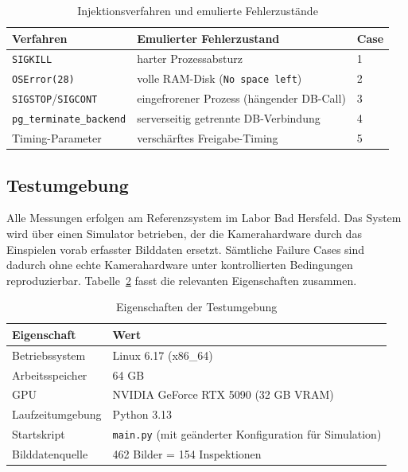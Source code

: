 \begin{table}[htbp]
    \centering
    \caption{Injektionsverfahren und emulierte Fehlerzustände}
    \label{tab:injektion}
    \begin{tabularx}{\textwidth}{l>{\raggedright\arraybackslash}Xl}
        \hline
        \textbf{Verfahren} & \textbf{Emulierter Fehlerzustand} & \textbf{Case} \\
        \hline
        \texttt{SIGKILL}               & harter Prozessabsturz                         & 1 \\
        \texttt{OSError(28)}           & volle RAM-Disk (\texttt{No space left})       & 2 \\
        \texttt{SIGSTOP}/\texttt{SIGCONT} & eingefrorener Prozess (hängender DB-Call)  & 3 \\
        \texttt{pg\_terminate\_backend}   & serverseitig getrennte DB-Verbindung       & 4 \\
        Timing-Parameter                  & verschärftes Freigabe-Timing               & 5 \\
        \hline
    \end{tabularx}
\end{table}

\subsection{Testumgebung}
\label{sec:methodik-umgebung}

Alle Messungen erfolgen am Referenzsystem im Labor Bad Hersfeld. Das System wird über
einen Simulator betrieben, der die Kamerahardware durch das Einspielen vorab erfasster
Bilddaten ersetzt. Sämtliche Failure Cases sind dadurch ohne echte Kamerahardware unter
kontrollierten Bedingungen reproduzierbar. Tabelle~\ref{tab:testumgebung} fasst die
relevanten Eigenschaften zusammen.

\begin{table}[htbp]
    \centering
    \caption{Eigenschaften der Testumgebung}
    \label{tab:testumgebung}
    \begin{tabularx}{\textwidth}{lX}
        \hline
        \textbf{Eigenschaft} & \textbf{Wert} \\
        \hline
        Betriebssystem      & Linux 6.17 (x86\_64) \\
        Arbeitsspeicher     & 64 GB \\
        GPU                 & NVIDIA GeForce RTX 5090 (32 GB VRAM) \\
        Laufzeitumgebung    & Python 3.13 \\
        Startskript         & \texttt{main.py} (mit geänderter Konfiguration für Simulation) \\
        Bilddatenquelle     & 462 Bilder = 154 Inspektionen \\
        \hline
    \end{tabularx}
\end{table}

